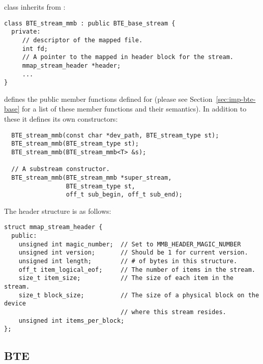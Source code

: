 class inherits from :
\begin{verbatim}
class BTE_stream_mmb : public BTE_base_stream {
  private:
     // descriptor of the mapped file.  
     int fd;   
     // A pointer to the mapped in header block for the stream. 
     mmap_stream_header *header;
     ...
}  
\end{verbatim}

 defines the public member
functions defined for  (please see
Section~\ref{sec:imp-bte-base} for a list of these member
functions and their semantics).  In addition to these it
defines its own constructors: 

\begin{verbatim}
  BTE_stream_mmb(const char *dev_path, BTE_stream_type st);
  BTE_stream_mmb(BTE_stream_type st); 
  BTE_stream_mmb(BTE_stream_mmb<T> &s); 
  
  // A substream constructor.
  BTE_stream_mmb(BTE_stream_mmb *super_stream,
                 BTE_stream_type st,
                 off_t sub_begin, off_t sub_end);
\end{verbatim}

The  header
structure is as follows:

\begin{verbatim}
struct mmap_stream_header { 
  public:
    unsigned int magic_number;  // Set to MMB_HEADER_MAGIC_NUMBER
    unsigned int version;       // Should be 1 for current version.
    unsigned int length;        // # of bytes in this structure.
    off_t item_logical_eof;     // The number of items in the stream.
    size_t item_size;           // The size of each item in the stream.
    size_t block_size;          // The size of a physical block on the device
                                // where this stream resides.
    unsigned int items_per_block;
};
\end{verbatim}




\subsection{BTE }

